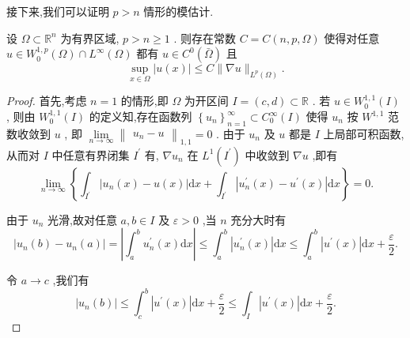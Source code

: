 \documentclass[lang=cn,newtx,10pt,scheme=chinese,thmcnt=chapter]{elegantbook}
\newcommand{\dif}{\mathrm{d}}
\begin{document}
接下来,我们可以证明 \(p > n\) 情形的模估计.
\begin{lemma}\label{3.4.4}
    设 \(\Omega  \subset  {\mathbb{R}}^{n}\) 为有界区域, \(p > n \geq  1\) . 则存在常数 \(C = C\left( {n,p,\Omega }\right)\) 使得对任意 \(u \in  {W}_{0}^{1,p}\left( \Omega \right)  \cap  {L}^{\infty }\left( \Omega \right)\) 都有 \(u \in  {C}^{0}\left( \bar{\Omega }\right)\) 且
\begin{equation}
\mathop{\sup }\limits_{{x \in  \Omega }}\left| {u\left( x\right) }\right|  \leqslant  C\parallel \nabla u{\parallel }_{{L}^{p}\left( \Omega \right) }. \label{3.29}
\end{equation}

\end{lemma}
\begin{proof}
    首先,考虑 \(n = 1\) 的情形,即 \(\Omega\) 为开区间 \(I = \left( {c,d}\right)  \subset  \mathbb{R}\) . 若 \(u \in  {W}_{0}^{1,1}\left( I\right)\) , 则由 \({W}_{0}^{1,1}\left( I\right)\) 的定义知,存在函数列 \({\left\{  {u}_{n}\right\}  }_{n = 1}^{\infty } \subset  {C}_{0}^{\infty }\left( I\right)\) 使得 \({u}_{n}\) 按 \({W}^{1,1}\) 范数收敛到 \(u\) , 即 \(\mathop{\lim }\limits_{{n \rightarrow  \infty }}{\begin{Vmatrix}{u}_{n} - u\end{Vmatrix}}_{1,1} = 0\) . 由于 \({u}_{n}\) 及 \(u\) 都是 \(I\) 上局部可积函数,从而对 \(I\) 中任意有界闭集 \({I}^{\prime }\) 有, \(\nabla {u}_{n}\) 在 \({L}^{1}\left( {I}^{\prime }\right)\) 中收敛到 \(\nabla u\) ,即有
\begin{equation*}
\mathop{\lim }\limits_{{n \rightarrow  \infty }}\left\{  {{\int }_{{I}^{\prime }}\left| {{u}_{n}\left( x\right)  - u\left( x\right) }\right| {\dif x} + {\int }_{{I}^{\prime }}\left| {{u}_{n}^{\prime }\left( x\right)  - {u}^{\prime }\left( x\right) }\right| {\dif x}}\right\}   = 0.
\end{equation*}

由于 \({u}_{n}\) 光滑,故对任意 \(a,b \in  I\) 及 \(\varepsilon  > 0\) ,当 \(n\) 充分大时有
\begin{equation}
\left| {{u}_{n}\left( b\right)  - {u}_{n}\left( a\right) }\right|  = \left| {{\int }_{a}^{b}{u}_{n}^{\prime }\left( x\right) {\dif x}}\right|  \leqslant  {\int }_{a}^{b}\left| {{u}_{n}^{\prime }\left( x\right) }\right| {\dif x}
\leqslant  {\int }_{a}^{b}\left| {{u}^{\prime }\left( x\right) }\right| {\dif x} + \frac{\varepsilon }{2}. \label{3.30}
\end{equation}

令 \(a \rightarrow  c\) ,我们有
\begin{equation*}
\left| {{u}_{n}\left( b\right) }\right|  \leqslant  {\int }_{c}^{b}\left| {{u}^{\prime }\left( x\right) }\right| {\dif x} + \frac{\varepsilon }{2} \leqslant  {\int }_{I}\left| {{u}^{\prime }\left( x\right) }\right| {\dif x} + \frac{\varepsilon }{2}.
\end{equation*}


\end{proof}
\end{document}
